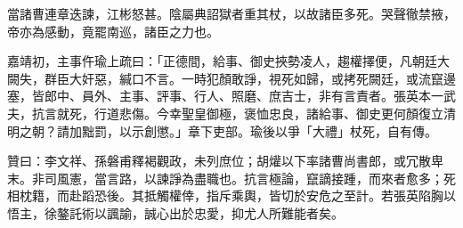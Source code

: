 \begin{pinyinscope}
當諸曹連章迭諫，江彬怒甚。陰屬典詔獄者重其杖，以故諸臣多死。哭聲徹禁掖，帝亦為感動，竟罷南巡，諸臣之力也。

嘉靖初，主事仵瑜上疏曰：「正德間，給事、御史挾勢凌人，趨權擇便，凡朝廷大闕失，群臣大奸惡，緘口不言。一時犯顏敢諍，視死如歸，或拷死闕廷，或流竄邊塞，皆郎中、員外、主事、評事、行人、照磨、庶吉士，非有言責者。張英本一武夫，抗言就死，行道悲傷。今幸聖皇御極，褒恤忠良，諸給事、御史更何顏復立清明之朝？請加黜罰，以示創懲。」章下吏部。瑜後以爭「大禮」杖死，自有傳。

贊曰：李文祥、孫磐甫釋褐觀政，未列庶位；胡爟以下率諸曹尚書郎，或冗散卑末。非司風憲，當言路，以諫諍為盡職也。抗言極論，竄謫接踵，而來者愈多；死相枕籍，而赴蹈恐後。其抵觸權倖，指斥乘輿，皆切於安危之至計。若張英陷胸以悟主，徐鏊託術以諷諭，誠心出於忠愛，抑尤人所難能者矣。


\end{pinyinscope}